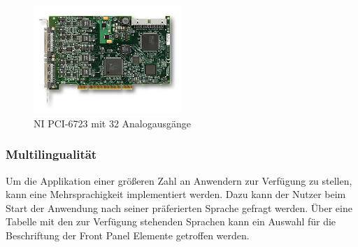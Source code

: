 	\begin{figure}[h!]
	\centering
		\includegraphics[width=0.5\textwidth]{Pics/pci6723.jpg}
	\caption{NI PCI-6723 mit 32 Analogausgänge \cite{ni-pci} }
	\label{fig:a7}
	\end{figure}




\subsubsection{Multilingualität}
Um die Applikation einer größeren Zahl an Anwendern zur Verfügung zu stellen, kann eine Mehrsprachigkeit implementiert werden. 
Dazu kann der Nutzer beim Start der Anwendung  nach seiner präferierten Sprache gefragt werden. Über eine Tabelle mit den zur Verfügung stehenden Sprachen kann
ein Auswahl für die Beschriftung der Front Panel Elemente getroffen werden.




